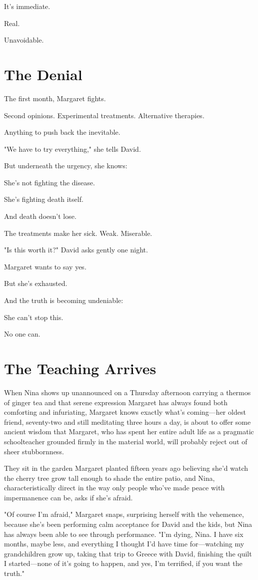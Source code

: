 \documentclass[11pt,twoside]{book}
\begin{document}
It's immediate.

Real.

Unavoidable.

\section*{The Denial}

The first month, Margaret fights.

Second opinions. Experimental treatments. Alternative therapies.

Anything to push back the inevitable.

"We have to try everything," she tells David.

But underneath the urgency, she knows:

She's not fighting the disease.

She's fighting death itself.

And death doesn't lose.

The treatments make her sick. Weak. Miserable.

"Is this worth it?" David asks gently one night.

Margaret wants to say yes.

But she's exhausted.

And the truth is becoming undeniable:

She can't stop this.

No one can.

\section*{The Teaching Arrives}

When Nina shows up unannounced on a Thursday afternoon carrying a thermos of ginger tea and that serene expression Margaret has always found both comforting and infuriating, Margaret knows exactly what's coming—her oldest friend, seventy-two and still meditating three hours a day, is about to offer some ancient wisdom that Margaret, who has spent her entire adult life as a pragmatic schoolteacher grounded firmly in the material world, will probably reject out of sheer stubbornness.

They sit in the garden Margaret planted fifteen years ago believing she'd watch the cherry tree grow tall enough to shade the entire patio, and Nina, characteristically direct in the way only people who've made peace with impermanence can be, asks if she's afraid.

"Of course I'm afraid," Margaret snaps, surprising herself with the vehemence, because she's been performing calm acceptance for David and the kids, but Nina has always been able to see through performance. "I'm dying, Nina. I have six months, maybe less, and everything I thought I'd have time for—watching my grandchildren grow up, taking that trip to Greece with David, finishing the quilt I started—none of it's going to happen, and yes, I'm terrified, if you want the truth."
\end{document}

